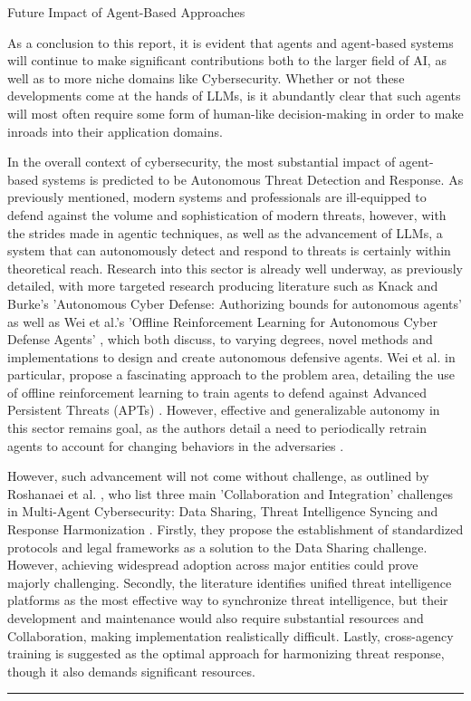 \documentclass[a4paper,9pt]{scrartcl}
\makeatletter
\renewcommand{\subsection}{\@startsection{subsection}{2}{0mm}
  {0.25\baselineskip} 
  {0.25\baselineskip} 
  {\normalfont\normalsize\bfseries}}
\makeatother
\begin{document}
\subsection{Future Impact of Agent-Based Approaches}

As a conclusion to this report, it is evident that agents and agent-based systems will
continue to make significant contributions both to the larger field of AI, as well as to
more niche domains like Cybersecurity. Whether or not these developments come at the
hands of LLMs, is it abundantly clear that such agents will most often require some 
form of human-like decision-making in order to make inroads into their application domains. 

In the overall context of cybersecurity, the most substantial impact of agent-based
systems is predicted to be Autonomous Threat Detection and Response. As previously mentioned,
modern systems and professionals are ill-equipped to defend against the volume and 
sophistication of modern threats, however, with the strides made in agentic techniques, as well
as the advancement of LLMs, a system that can autonomously detect and
respond to threats is certainly within theoretical reach. Research into this sector is already 
well underway, as previously detailed, with more targeted research producing literature such as Knack and Burke's 
'Autonomous Cyber Defense: Authorizing bounds for autonomous agents' \cite{AutonomousCyberDefence} as well as 
Wei et al.'s 'Offline Reinforcement Learning for Autonomous Cyber Defense Agents' 
\cite{weiOfflineReinforcementLearning2025}, which both discuss, to varying degrees, novel methods and 
implementations to design and create autonomous defensive agents. Wei et al. in particular, propose a 
fascinating approach to the problem area, detailing the use of offline reinforcement learning to train agents 
to defend against Advanced Persistent Threats (APTs) \cite{weiOfflineReinforcementLearning2025}. 
However, effective and generalizable autonomy in this sector remains goal, as the authors detail a need 
to periodically retrain agents to account for changing behaviors in the adversaries 
\cite{weiOfflineReinforcementLearning2025}.


However, such advancement will not come without challenge, as outlined by Roshanaei et al.
\cite{roshanaeiEnhancingCybersecurityAI2024}, who list three main 'Collaboration and 
Integration' challenges in Multi-Agent Cybersecurity: Data Sharing, Threat Intelligence 
Syncing and Response Harmonization \cite{roshanaeiEnhancingCybersecurityAI2024}. Firstly, 
they propose the establishment of standardized protocols and legal frameworks 
\cite{roshanaeiEnhancingCybersecurityAI2024} as a solution to the Data Sharing 
challenge. However, achieving widespread adoption across major entities could prove majorly challenging. 
Secondly, the literature identifies unified threat intelligence platforms as the most 
effective way to synchronize threat intelligence, but their development and maintenance 
would also require substantial resources and Collaboration, making implementation realistically difficult. 
Lastly, cross-agency training is suggested as the optimal approach for harmonizing threat response, though it 
also demands significant resources.


\rule{\linewidth}{0.2mm}


\end{document}
